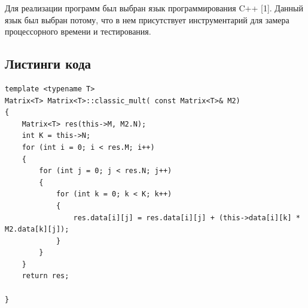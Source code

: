 Для реализации программ был выбран язык программирования C++ [1]. Данный язык был выбран потому, что в нем присутствует инструментарий для замера процессорного времени и тестирования.

\subsection{Листинги кода}

\begin{lstlisting}[caption=Алгоритм простого умножения матриц, label=list:canon, language={}]
template <typename T>
Matrix<T> Matrix<T>::classic_mult( const Matrix<T>& M2)
{
	Matrix<T> res(this->M, M2.N);
	int K = this->N;
	for (int i = 0; i < res.M; i++)
	{
		for (int j = 0; j < res.N; j++)
		{
			for (int k = 0; k < K; k++)
			{
				res.data[i][j] = res.data[i][j] + (this->data[i][k] * M2.data[k][j]);
			}
		}
	}
	return res;

}
\end{lstlisting}

